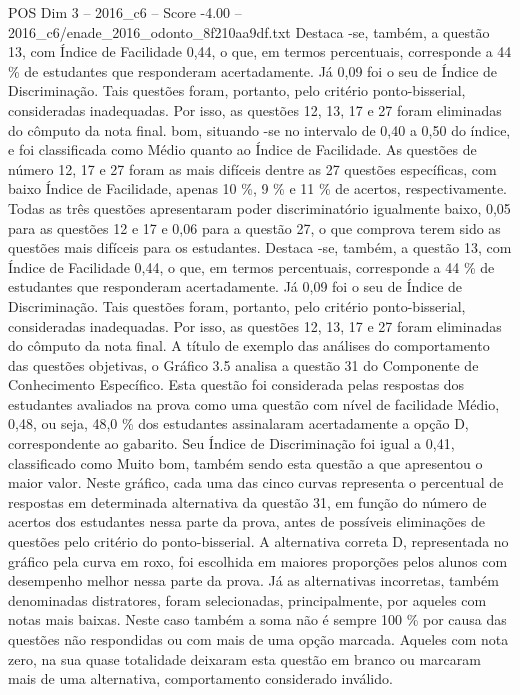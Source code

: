 \begin{textsample}{POS Dim 3 – 2016\_c6 – Score -4.00 – 2016\_c6/enade\_2016\_odonto\_8f210aa9df.txt}
Destaca -se, também, a questão 13, com Índice de Facilidade 0,44, o que, em termos percentuais, corresponde a 44 \% de estudantes que responderam acertadamente.
Já 0,09 foi o seu de Índice de Discriminação.
Tais questões foram, portanto, pelo critério ponto-bisserial, consideradas inadequadas.
Por isso, as questões 12, 13, 17 e 27 foram eliminadas do cômputo da nota final. bom, situando -se no intervalo de 0,40 a 0,50 do índice, e foi classificada como Médio quanto ao Índice de Facilidade.
As questões de número 12, 17 e 27 foram as mais difíceis dentre as 27 questões específicas, com baixo Índice de Facilidade, apenas 10 \%, 9 \% e 11 \% de acertos, respectivamente.
Todas as três questões apresentaram poder discriminatório igualmente baixo, 0,05 para as questões 12 e 17 e 0,06 para a questão 27, o que comprova terem sido as questões mais difíceis para os estudantes.
Destaca -se, também, a questão 13, com Índice de Facilidade 0,44, o que, em termos percentuais, corresponde a 44 \% de estudantes que responderam acertadamente.
Já 0,09 foi o seu de Índice de Discriminação.
Tais questões foram, portanto, pelo critério ponto-bisserial, consideradas inadequadas.
Por isso, as questões 12, 13, 17 e 27 foram eliminadas do cômputo da nota final.
A título de exemplo das análises do comportamento das questões objetivas, o Gráfico 3.5 analisa a questão 31 do Componente de Conhecimento Específico.
Esta questão foi considerada pelas respostas dos estudantes avaliados na prova como uma questão com nível de facilidade Médio, 0,48, ou seja, 48,0 \% dos estudantes assinalaram acertadamente a opção D, correspondente ao gabarito.
Seu Índice de Discriminação foi igual a 0,41, classificado como Muito bom, também sendo esta questão a que apresentou o maior valor.
Neste gráfico, cada uma das cinco curvas representa o percentual de respostas em determinada alternativa da questão 31, em função do número de acertos dos estudantes nessa parte da prova, antes de possíveis eliminações de questões pelo critério do ponto-bisserial.
A alternativa correta D, representada no gráfico pela curva em roxo, foi escolhida em maiores proporções pelos alunos com desempenho melhor nessa parte da prova.
Já as alternativas incorretas, também denominadas distratores, foram selecionadas, principalmente, por aqueles com notas mais baixas.
Neste caso também a soma não é sempre 100 \% por causa das questões não respondidas ou com mais de uma opção marcada.
Aqueles com nota zero, na sua quase totalidade deixaram esta questão em branco ou marcaram mais de uma alternativa, comportamento considerado inválido.

\end{textsample}
